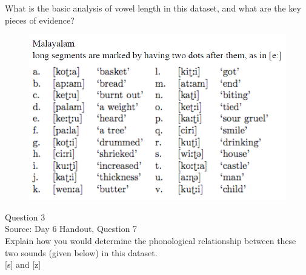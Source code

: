 \documentclass[12pt]{article}
\begin{document}
What is the basic analysis of vowel length in this dataset, and what are the key pieces of evidence?\\

\begin{figure}[H]
\includegraphics{../images/malayalam.png}
\end{figure}

\newpage

{\large Question 3}\\

Source: Day 6 Handout, Question 7\\

Explain how you would determine the phonological relationship between these two sounds (given below) in this dataset.\\

{[s]} and {[z]}
\end{document}
